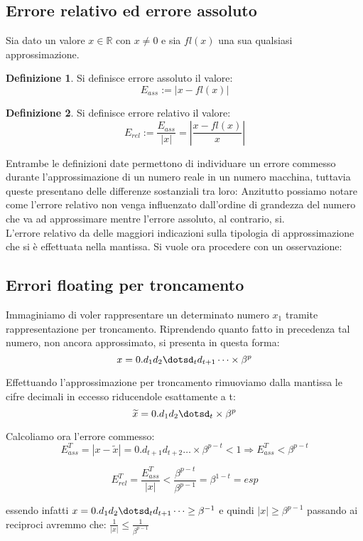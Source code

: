 \documentclass[12pt, a4paper]{book}
\theoremstyle{definition}
\newtheorem{defn}{Definizione}[section]
\begin{document}
\subsection{Errore relativo ed errore assoluto}
\begin{flushleft}
Sia dato un valore $x \in \mathbb{R}$ con $x \neq 0$ e sia $fl(x)$ una sua qualsiasi approssimazione. 
\begin{defn}
Si definisce errore assoluto il valore: \[ E_{ass}:= |x - fl(x)| \]
\end{defn}
\begin{defn}
Si definisce errore relativo il valore: \[E_{rel}:= \frac{E_{ass}}{|x|} =  \displaystyle\left\lvert \frac{x - fl(x)}{x} \right\rvert\]
\end{defn}
Entrambe le definizioni date permettono di individuare un errore commesso durante l'approssimazione di un numero reale in un numero macchina, tuttavia queste presentano delle differenze sostanziali tra loro: 
Anzitutto possiamo notare come l'errore relativo non venga influenzato dall'ordine di grandezza del numero che va ad approssimare mentre l'errore assoluto, al contrario, si. \\
L'errore relativo da delle maggiori indicazioni sulla tipologia di approssimazione che si è effettuata nella mantissa.  
Si vuole ora procedere con un osservazione:
\end{flushleft}

\subsection{Errori floating per troncamento}
\begin{flushleft}
Immaginiamo di voler rappresentare un determinato numero $x_{1}$  tramite rappresentazione per troncamento. 
Riprendendo quanto fatto in precedenza tal numero, non ancora approssimato,  si presenta in questa forma: 
\[
	 x = 0.d_{1}d_{2}\dotsd_{t}d_{t+1}\dots \times \beta^{p} 
\]

Effettuando l'approssimazione per troncamento rimuoviamo dalla mantissa le cifre decimali in eccesso riducendole esattamente a t:
\[ 
	\widetilde{x} = 0.d_{1}d_{2}\dotsd_{t}\times\beta^{p} 
\]

Calcoliamo ora l'errore commesso: 
\[ 
	E_{ass}^{T} = |x - \widetilde{x}| =   0.d_{t+1}d_{t+2}\dots\times\beta^{p-t} < 1 \Longrightarrow  E_{ass}^{T} < \beta^{p-t}  
\]

\[
	E_{rel}^{T} = \frac{E_{ass}^{T}}{|x|} < \frac{ \beta^{p-t}}{ \beta^{p-1}} =  \beta^{1-t} = esp \]

essendo infatti $x = 0.d_{1}d_{2}\dotsd_{t}d_{t+1}\dots \geq \beta^{-1}$ e quindi $|x| \geq \beta^{p-1}$ passando ai reciproci avremmo che: $\frac{1}{|x|} \leq \frac{1}{\beta^{p-1}}$
\end{flushleft}
\pagebreak
\end{document}
